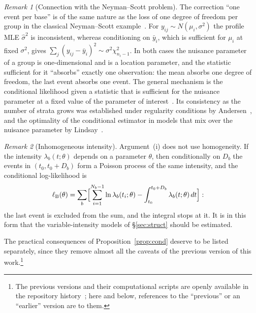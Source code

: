 \documentclass[11pt,a4paper]{article}
\theoremstyle{plain}
\theoremstyle{remark}
\newtheorem{remark}{Remark}
\begin{document}
\begin{remark}[Connection with the Neyman--Scott problem]\label{rem:neymanscott}
The correction ``one event per base'' is of the same nature as the loss of one
degree of freedom per group in the classical Neyman--Scott
example~\cite{neymanscott1948}. For $y_{ij}\sim N(\mu_i,\sigma^2)$ the profile
MLE $\hat\sigma^2$ is inconsistent, whereas conditioning on $\bar y_i$, which is
sufficient for $\mu_i$ at fixed $\sigma^2$, gives
$\sum_j(y_{ij}-\bar y_i)^2\sim\sigma^2\chi^2_{n_i-1}$. In both cases the nuisance
parameter of a group is one-dimensional and is a location parameter, and the
statistic sufficient for it ``absorbs'' exactly one observation: the mean absorbs
one degree of freedom, the last event absorbs one event. The general mechanism is
the conditional likelihood given a statistic that is sufficient for the nuisance
parameter at a fixed value of the parameter of
interest~\cite{kalbfleischsprott1970}. Its consistency as the number of strata
grows was established under regularity conditions by
Andersen~\cite{andersen1970}, and the optimality of the conditional estimator in
models that mix over the nuisance parameter by Lindsay~\cite{lindsay1980}.
\end{remark}

\begin{remark}[Inhomogeneous intensity]\label{rem:inhom}
Argument~(i) does not use homogeneity. If the intensity $\lambda_b(t;\theta)$
depends on a parameter $\theta$, then conditionally on $D_b$ the events in
$(t_0,t_0+D_b)$ form a Poisson process of the same intensity, and the
conditional log-likelihood is
\begin{equation}\label{eq:condinhom}
\ell_{\mathrm B}(\theta)=\sum_b\Bigl[\sum_{i=1}^{N_b-1}\ln\lambda_b(t_i;\theta)
-\int_{t_0}^{t_0+D_b}\lambda_b(t;\theta)\,dt\Bigr]:
\end{equation}
the last event is excluded from the sum, and the integral stops at it. It is in
this form that the variable-intensity models of \S\ref{sec:struct} should be
estimated.
\end{remark}

The practical consequences of Proposition~\ref{prop:cond} deserve to be listed
separately, since they remove almost all the caveats of the previous version of
this work.\footnote{The previous versions and their computational scripts are
openly available in the repository history~\cite{repunithunt}; here and below,
references to the ``previous'' or an ``earlier'' version are to them.}
\end{document}
